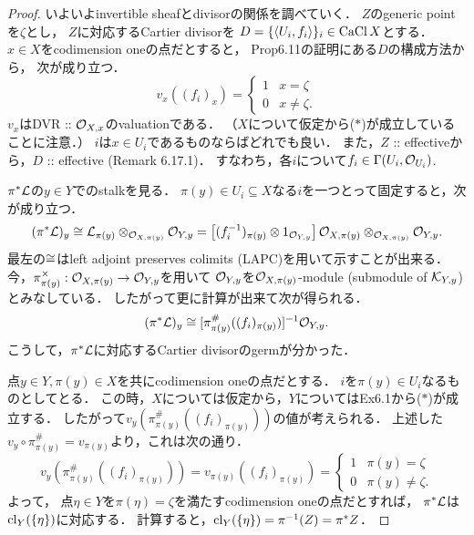 \documentclass[a4paper]{jsarticle}
\newcommand{\CaCl}{\operatorname{CaCl}}
\newcommand{\dsharp}{\times} %
\begin{document}
\begin{proof}
        いよいよinvertible sheafとdivisorの関係を調べていく．
        $Z$のgeneric pointを$\zeta$とし，
        $Z$に対応するCartier divisorを
        $D=\{\sect{U_i}{f_i}\}_i \in \CaCl X$とする．
        $x \in X$をcodimension oneの点だとすると，
        Prop6.11の証明にある$D$の構成方法から，
        次が成り立つ．
        \[
            v_x((f_i)_x)=
            \begin{cases}{}
                1   &   x=\zeta \\
                0   &   x \neq \zeta.
            \end{cases}
        \]
        $v_x$はDVR :: $\mathcal{O}_{X,x}$のvaluationである．
        （$X$について仮定から($*$)が成立していることに注意．）
        $i$は$x \in U_i$であるものならばどれでも良い．
        また，$Z$ :: effectiveから，$D$ :: effective (Remark 6.17.1)．
        すなわち，各$i$について$f_i \in \Gamma(U_i, \mathcal{O}_{U_i})$.

        $\pi^* \mathcal{L}$の$y \in Y$でのstalkを見る．
        $\pi(y) \in U_i \subseteq X$なる$i$を一つとって固定すると，次が成り立つ．
        \[
            (\pi^* \mathcal{L})_y
            \cong \mathcal{L}_{\pi(y)} \otimes_{\mathcal{O}_{X, \pi(y)}} \mathcal{O}_{Y, y}
            =
            \left[ (f_i^{-1})_{\pi(y)} \otimes 1_{\mathcal{O}_{Y, y}} \right]
            \mathcal{O}_{X, \pi(y)} \otimes_{\mathcal{O}_{X, \pi(y)}}\mathcal{O}_{Y, y}.
        \]
        最左の$\cong$はleft adjoint preserves colimits (LAPC)を用いて示すことが出来る．
        今，$\pi^{\dsharp}_{\pi(y)}: \shO_{X, \pi(y)} \to \shO_{Y, y}$を用いて
        $\mathcal{O}_{Y, y}$を$\mathcal{O}_{X, \pi(y)}$-module (submodule of $\mathcal{K}_{Y,y}$)とみなしている．
        したがって更に計算が出来て次が得られる．
        \[ (\pi^* \mathcal{L})_y \cong [\pi^{\#}_{\pi(y)}((f_i)_{\pi(y)})]^{-1}\mathcal{O}_{Y, y}. \]
        こうして，$\pi^*\mathcal{L}$に対応するCartier divisorのgermが分かった．

        点$y \in Y, \pi(y) \in X$を共にcodimension oneの点だとする．
        $i$を$\pi(y) \in U_i$なるものとしてとる．
        この時，$X$については仮定から，$Y$についてはEx6.1から($*$)が成立する．
        したがって$v_y(\pi^{\#}_{\pi(y)}((f_i)_{\pi(y)}))$の値が考えられる．
        上述した$v_y \circ \pi^{\#}_{\pi(y)}=v_{\pi(y)}$より，これは次の通り．
        \[
            v_y \left(\pi^{\#}_{\pi(y)}((f_i)_{\pi(y)})\right)=
            v_{\pi(y)}((f_i)_{\pi(y)})=
            \begin{cases}{}
                1 & \pi(y)=\zeta \\
                0 & \pi(y) \neq \zeta.
            \end{cases}
        \]
        よって，
        点$\eta \in Y$を$\pi(\eta)=\zeta$を満たすcodimension oneの点だとすれば，
        $\pi^*\mathcal{L}$は$\operatorname{cl}_{Y}(\{\eta\})$に対応する．
        計算すると，$\operatorname{cl}_{Y}(\{\eta\})=\pi^{-1}(Z)=\pi^*Z$．
    \end{proof}
\end{document}
